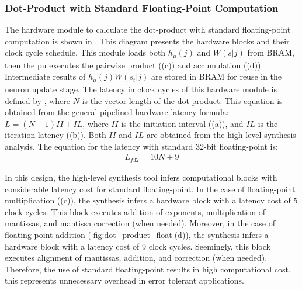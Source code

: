 \subsubsection{Dot-Product with Standard Floating-Point Computation}
 The hardware module to calculate the dot-product with standard floating-point computation is shown in . This diagram presents the hardware blocks and their clock cycle schedule. This module loads both $h_\mu(j)$ and $W(s|j)$ from BRAM, then the \gls{pu} executes the pairwise product ((c)) and accumulation ((d)). Intermediate results of $h_\mu(j) W(s_t|j)$ are stored in BRAM for reuse in the neuron update stage. The latency in clock cycles of this hardware module is defined by , where $N$ is the vector length of the dot-product. This equation is obtained from the general pipelined hardware latency formula: $L=\left(N-1\right)II+IL$, where $II$ is the initiation interval ((a)), and $IL$ is the iteration latency ((b)). Both $II$ and $IL$ are obtained from the high-level synthesis analysis. The equation for the latency with standard 32-bit floating-point is:
 \begin{eqnarray} \label{eq:dot_standard_float_latency}
 L_{f32}=10N+9
 \end{eqnarray}
 
In this design, the high-level synthesis tool infers computational blocks with considerable latency cost for standard floating-point. In the case of floating-point multiplication ((c)), the synthesis infers a hardware block with a latency cost of 5 clock cycles. This block executes addition of exponents, multiplication of mantissas, and mantissa correction (when needed). Moreover, in the case of floating-point addition (\ref{fig:dot_product_float}(d)), the synthesis infers a hardware block with a latency cost of 9 clock cycles. Seemingly, this block executes alignment of mantissas, addition, and correction (when needed). Therefore, the use of standard floating-point results in high computational cost, this represents unnecessary overhead in error tolerant applications.


